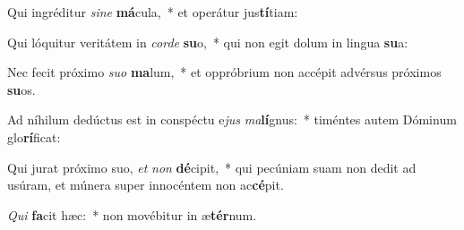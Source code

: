 \item Qui ingréditur \textit{si}\textit{ne} \textbf{má}cula,~* et operátur jus\textbf{tí}tiam:
\item Qui lóquitur veritátem in \textit{cor}\textit{de} \textbf{su}o,~* qui non egit dolum in lingua \textbf{su}a:
\item Nec fecit próximo \textit{su}\textit{o} \textbf{ma}lum,~* et oppróbrium non accépit advérsus próximos \textbf{su}os.
\item Ad níhilum dedúctus est in conspéctu e\textit{jus} \textit{ma}\textbf{lí}gnus:~* timéntes autem Dóminum glo\textbf{rí}ficat:
\item Qui jurat próximo suo, \textit{et} \textit{non} \textbf{dé}cipit,~* qui pecúniam suam non dedit ad usúram, et múnera super innocéntem non ac\textbf{cé}pit.
\item \textit{Qui} \textbf{fa}cit hæc:~* non movébitur in æ\textbf{tér}num.
